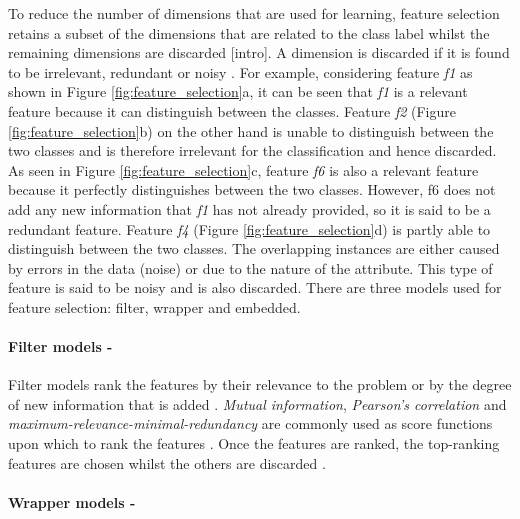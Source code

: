 \documentclass{article}[paper=a4,pagesize=auto,10pt]
\begin{document}
To reduce the number of dimensions that are used for learning, feature selection retains a subset of the dimensions that are related to the class label whilst the remaining dimensions are discarded [intro].  A dimension is discarded if it is found to be irrelevant, redundant or noisy \cite{sammut2017encyclopedia}.  For example, considering feature \textit{f1} as shown in Figure \ref{fig:feature_selection}a, it can be seen that \textit{f1} is a relevant feature because it can distinguish between the classes. Feature \textit{f2} (Figure \ref{fig:feature_selection}b) on the other hand is unable to distinguish between the two classes and is therefore irrelevant for the classification and hence discarded.  As seen in Figure \ref{fig:feature_selection}c, feature \textit{f6} is also a relevant feature because it perfectly distinguishes between the two classes.  However, f6 does not add any new information that \textit{f1} has not already provided, so it is said to be a redundant feature. Feature \textit{f4} (Figure \ref{fig:feature_selection}d) is partly able to distinguish between the two classes.  The overlapping instances are either caused by errors in the data (noise) or due to the nature of the attribute.  This type of feature is said to be noisy and is also discarded. There are three models used for feature selection: filter, wrapper and embedded.

\paragraph{Filter models -}

Filter models rank the features by their relevance to the problem or by the degree of new information that is added \cite{de2015feature}.  \textit{Mutual information}, \textit{Pearson’s correlation} and \textit{maximum-relevance-minimal-redundancy} are commonly used as score functions upon which to rank the features \cite{de2015feature}. Once the features are ranked, the top-ranking features are chosen whilst the others are discarded \cite{sammut2017encyclopedia}.

\paragraph{Wrapper models -}
\end{document}
